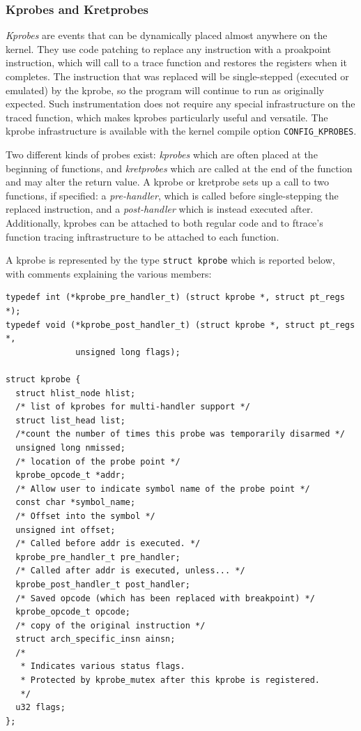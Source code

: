\subsubsection*{Kprobes and Kretprobes}

\textit{Kprobes} are events that can be dynamically placed almost anywhere on
the kernel. They use code patching to replace any instruction with a proakpoint
instruction, which will call to a trace function and restores the registers when
it completes. The instruction that was replaced will be single-stepped (executed
or emulated) by the kprobe, so the program will continue to run as originally
expected. Such instrumentation does not require any special infrastructure on
the traced function, which makes kprobes particularly useful and versatile. The
kprobe infrastructure is available with the kernel compile option
\verb|CONFIG_KPROBES|.

Two different kinds of probes exist: \textit{kprobes} which are often placed at
the beginning of functions, and \textit{kretprobes} which are called at the end
of the function and may alter the return value. A kprobe or kretprobe sets up a
call to two functions, if specified: a \textit{pre-handler}, which is called
before single-stepping the replaced instruction, and a \textit{post-handler}
which is instead executed after. Additionally, kprobes can be attached to both
regular code and to ftrace's function tracing inftrastructure to be attached to
each function.

A kprobe is represented by the type \verb|struct kprobe| which is reported
below, with comments explaining the various members:

\begin{verbatim}
typedef int (*kprobe_pre_handler_t) (struct kprobe *, struct pt_regs *);
typedef void (*kprobe_post_handler_t) (struct kprobe *, struct pt_regs *,
              unsigned long flags);

struct kprobe {
  struct hlist_node hlist;
  /* list of kprobes for multi-handler support */
  struct list_head list;
  /*count the number of times this probe was temporarily disarmed */
  unsigned long nmissed;
  /* location of the probe point */
  kprobe_opcode_t *addr;
  /* Allow user to indicate symbol name of the probe point */
  const char *symbol_name;
  /* Offset into the symbol */
  unsigned int offset;
  /* Called before addr is executed. */
  kprobe_pre_handler_t pre_handler;
  /* Called after addr is executed, unless... */
  kprobe_post_handler_t post_handler;
  /* Saved opcode (which has been replaced with breakpoint) */
  kprobe_opcode_t opcode;
  /* copy of the original instruction */
  struct arch_specific_insn ainsn;
  /*
   * Indicates various status flags.
   * Protected by kprobe_mutex after this kprobe is registered.
   */
  u32 flags;
};
\end{verbatim}

